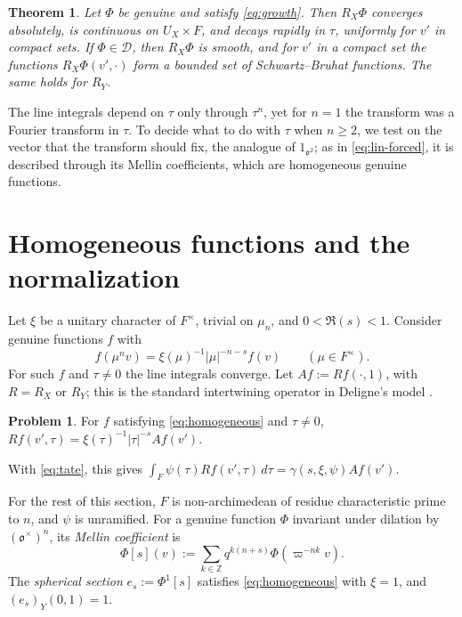 \documentclass[reqno]{amsart}
\newcommand{\Dc}{\mathcal{D}}
\newcommand{\oo}{\mathfrak{o}}
\numberwithin{equation}{section}
\theoremstyle{definition}
\newtheorem{problem}{Problem}[section]
\theoremstyle{plain}
\newtheorem{theorem}{Theorem}[section]
\begin{document}
\begin{theorem}\label{th:lines}
  Let $\Phi$ be genuine and satisfy \eqref{eq:growth}.  Then $R_X \Phi$ converges absolutely, is continuous on $U_X \times F$, and decays rapidly in $\tau$, uniformly for $v'$ in compact sets.  If $\Phi \in \Dc$, then $R_X \Phi$ is smooth, and for $v'$ in a compact set the functions $R_X \Phi(v', \cdot)$ form a bounded set of Schwartz--Bruhat functions.  The same holds for $R_Y$.
\end{theorem}

The line integrals depend on $\tau$ only through $\tau^n$, yet for $n = 1$ the transform was a Fourier transform in $\tau$.  To decide what to do with $\tau$ when $n \geq 2$, we test on the vector that the transform should fix, the analogue of $1_{\oo^2}$; as in \eqref{eq:lin-forced}, it is described through its Mellin coefficients, which are homogeneous genuine functions.

\section{Homogeneous functions and the normalization}\label{sec:normalization}

Let $\xi$ be a unitary character of $F^\times$, trivial on $\mu_n$, and $0 < \Re(s) < 1$.  Consider genuine functions $f$ with
\begin{equation}\label{eq:homogeneous}
  f(\mu^n v) = \xi(\mu)^{-1} \lvert \mu \rvert^{-n-s} f(v) \qquad (\mu \in F^\times).
\end{equation}
For such $f$ and $\tau \neq 0$ the line integrals converge.  Let $A f := R f(\cdot, 1)$, with $R = R_X$ or $R_Y$; this is the standard intertwining operator in Deligne's model \cite[\S6.3]{Del}.

\begin{problem}\label{pr:homog-radon}
  For $f$ satisfying \eqref{eq:homogeneous} and $\tau \neq 0$, $R f(v', \tau) = \xi(\tau)^{-1} \lvert \tau \rvert^{-s} A f(v')$.
\end{problem}

With \eqref{eq:tate}, this gives $\int_F \psi(\tau) R f(v', \tau) \, d \tau = \gamma(s, \xi, \psi) A f(v')$.

For the rest of this section, $F$ is non-archimedean of residue characteristic prime to $n$, and $\psi$ is unramified.  For a genuine function $\Phi$ invariant under dilation by $(\oo^\times)^n$, its \emph{Mellin coefficient} is
\begin{equation*}
  \Phi[s](v) := \sum_{k \in \mathbb{Z}} q^{k (n + s)} \Phi(\varpi^{-n k} v).
\end{equation*}
The \emph{spherical section} $e_s := \Phi^1[s]$ satisfies \eqref{eq:homogeneous} with $\xi = 1$, and $(e_s)_Y(0, 1) = 1$.
\end{document}
